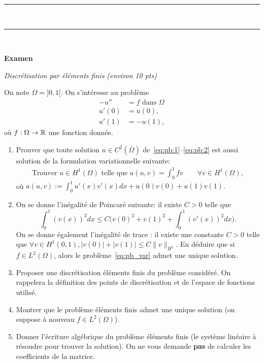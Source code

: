 \documentclass[12pt]{article}
\begin{document}
\noindent
{\rule{\textwidth}{.2mm}}\\
\renewcommand{\labelenumi}{(\alph{enumi})}

{\rule{\textwidth}{.2mm}}\\




\setcounter{MaxMatrixCols}{15} %

\begin{center}
{\bf Examen}
\end{center}

\begin{exo}
  \textit{Discr\'etisation par \'el\'ements finis (environ 10 pts)}

  On note $\Omega = ]0,1[$. On s'int\'eresse au probl\`eme
  \begin{align}
    \label{eq:pb:1}
    - u'' &= f \text{ dans } \Omega
    \\
    u'(0) &= u(0) ,
    \\
    \label{eq:pb:2}
     u'(1) &= - u(1) ,
  \end{align}
  o\`u $f : \Omega \to \mathbb{R}$ une fonction donn\'ee.
  
  \begin{enumerate}
  \item Prouver que toute solution $u \in C^2(\overline{\Omega})$ de~\eqref{eq:pb:1}--\eqref{eq:pb:2}
    est aussi solution de la formulation variationnelle suivante:
    \begin{align}
      \label{eq:pb_var}
      \text{Trouver } u \in H^1(\Omega) \text{ telle que }
      a(u,v)
      = \int_{0}^1 f v \qquad
      \forall v \in H^{1}(\Omega) ,
    \end{align}
    o\`u $a(u,v) := \int_{0}^1 u'(x) v'(x) dx + u(0) v(0) + u(1) v(1)$.
  \item On se donne l'in\'egalit\'e de Poincar\'e suivante: il existe $C > 0$ telle que
    \[
      \int_{0}^1 (v(x))^2 dx \leq C \Big( v(0)^2 + v(1)^2 + \int_0^1 (v'(x))^2 dx \Big) .
    \]
    On se donne \'egalement l'in\'egalit\'e de trace : il existe une constante $C>0$ telle que
    $\forall v \in H^1(0,1), |v(0)| + |v(1)| \leq C \| v \|_{H^1}$.
    En d\'eduire que si $f \in L^2(\Omega)$, alors
    le probl\`eme~\eqref{eq:pb_var} admet une unique solution.

  \item Proposer une discr\'etisation \'el\'ements finis du probl\`eme consid\'er\'e.
    On rappelera la d\'efinition des points de discr\'etisation et de l'espace de fonctions utilis\'e.

  \item Montrer que le probl\`eme \'el\'ements finis admet une unique solution 
    (on suppose \`a nouveau $f \in L^2(\Omega)$).

  \item Donner l'\'ecriture alg\'ebrique du probl\`eme \'el\'ements finis
    (le syst\`eme lin\'eaire \`a r\'esoudre pour trouver la solution).
    On ne vous demande \textbf{pas} de calculer les coefficients de la matrice.
  \end{enumerate}

\end{exo}
\end{document}

